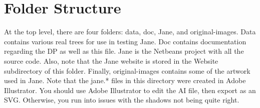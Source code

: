 \documentclass{article}
\begin{document}
\section{Folder Structure}

At the top level, there are four folders: data, doc, Jane, and original-images. Data contains various real trees for use in testing Jane. Doc contains documentation regarding the DP as well as this file. Jane is the Netbeans project with all the source code. Also, note that the Jane website is stored in the Website subdirectory of this folder. Finally, original-images contains some of the artwork used in Jane. Note that the jane.* files in this directory were created in Adobe Illustrator. You should use Adobe Illustrator to edit the AI file, then export as an SVG. Otherwise, you run into issues with the shadows not  being quite right.
\end{document}
